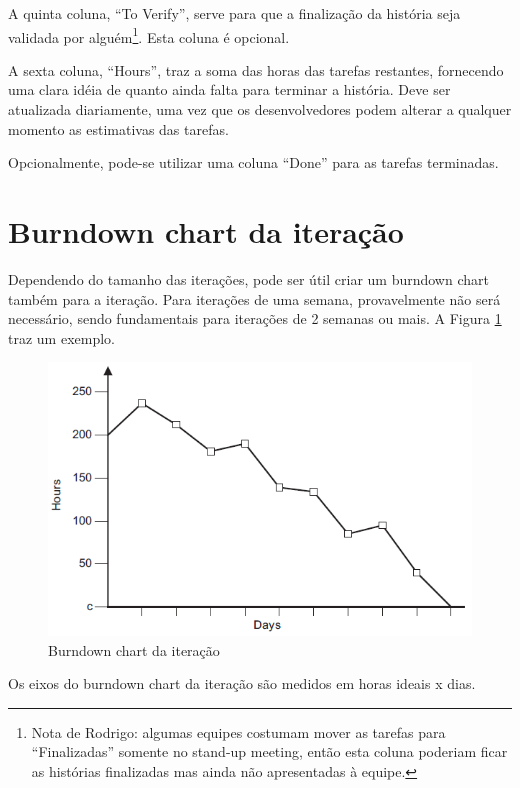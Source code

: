 \documentclass[a4paper,abntfigtabnum,noindentfirst]{abnt}
\begin{document}
A quinta coluna, ``To Verify'', serve para que a finalização da história seja validada por alguém\footnote{Nota de Rodrigo: algumas equipes costumam mover as tarefas para ``Finalizadas'' somente no stand-up meeting, então esta coluna poderiam ficar as histórias finalizadas mas ainda não apresentadas à equipe.}. Esta coluna é opcional.

A sexta coluna, ``Hours'', traz a soma das horas das tarefas restantes, fornecendo uma clara idéia de quanto ainda falta para terminar a história. Deve ser atualizada diariamente, uma vez que os desenvolvedores podem alterar a qualquer momento as estimativas das tarefas.

Opcionalmente, pode-se utilizar uma coluna ``Done'' para as tarefas terminadas.


\section{Burndown chart da iteração}

Dependendo do tamanho das iterações, pode ser útil criar um burndown chart também para a iteração. Para iterações de uma semana, provavelmente não será necessário, sendo fundamentais para iterações de 2 semanas ou mais. A Figura \ref{burndown-chart-da-iteracao} traz um exemplo.

\begin{figure}
  \caption{Burndown chart da iteração}
  \label{burndown-chart-da-iteracao}
  \begin{center}
  \includegraphics[scale=0.6]{burndown-chart-da-iteracao}
  \end{center}
\end{figure}

Os eixos do burndown chart da iteração são medidos em horas ideais x dias.
\end{document}
